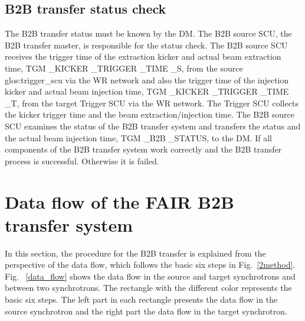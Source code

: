 %

\subsection{B2B transfer status check}
The B2B transfer status must be known by the DM. The B2B source SCU, the B2B transfer master, is responsible for the status check. The B2B source SCU receives the trigger time of the extraction kicker and actual beam extraction time, TGM \_KICKER \_TRIGGER \_TIME \_S, from the source \gls{glos:trigger_scu} via the WR network and also the trigger time of the injection kicker and actual beam injection time, TGM \_KICKER \_TRIGGER \_TIME \_T, from the target Trigger SCU via the WR network. The Trigger SCU collects the kicker trigger time and the beam extraction/injection time. The B2B source SCU examines the status of the B2B transfer system and transfers the status and the actual beam injection time, TGM \_B2B \_STATUS, to the DM. If all components of the B2B transfer system work correctly and the B2B transfer process is successful. Otherwise it is failed. 
\section{Data flow of the FAIR B2B transfer system}
In this section, the procedure for the B2B transfer is explained from the perspective of the data flow, which follows the basic six steps in Fig.~\ref{2method}. Fig. ~\ref{data_flow} shows the data flow in the source and target synchrotrons and between two synchrotrons. The rectangle with the different color represents the basic six steps. The left part in each rectangle presents the data flow in the source synchrotron and the right part the data flow in the target synchrotron.


